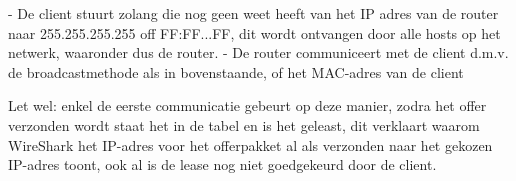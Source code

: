 - De client stuurt zolang die nog geen weet heeft van het IP adres van de router naar 255.255.255.255 off FF:FF...FF, dit wordt ontvangen door alle hosts op het netwerk, waaronder dus de router.
- De router communiceert met de client d.m.v. de broadcastmethode als in bovenstaande, of het MAC-adres van de client

Let wel: enkel de eerste communicatie gebeurt op deze manier, zodra het offer verzonden wordt staat het in de tabel en is het geleast, dit verklaart waarom WireShark het IP-adres voor het offerpakket al als verzonden naar het gekozen IP-adres toont, ook al is de lease nog niet goedgekeurd door de client. 